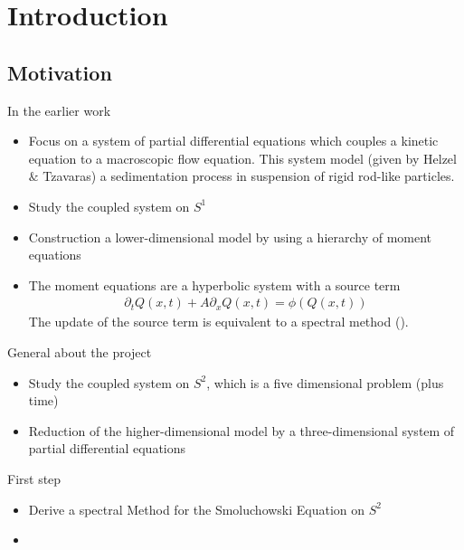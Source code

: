 \section{Introduction}
\subsection{Motivation}
\begin{frame}
	\scriptsize
	\begin{block}{In the earlier work}
		\begin{itemize}
			\item <1-> Focus on a system of partial differential equations which couples a kinetic equation to a macroscopic flow equation. This system model (given by Helzel $\&$ Tzavaras) a sedimentation process in suspension of rigid rod-like particles.
			\item <2-> Study the coupled system on $S^1$
			\item <3-> Construction a lower-dimensional model by using a hierarchy of moment equations
			\item <4-> The moment equations are a hyperbolic system with a source term
			\begin{align*}
				\partial_t Q(x,t) + A\partial_x Q(x,t) = \phi(Q(x,t))
		    \end{align*}
			The update of the source term is equivalent to a spectral method (\cite{doi:10.1137/21M1464592}).
		\end{itemize}
	\end{block}
	\begin{block}{General about the project}
		\begin{itemize}
			\item <5->  Study the coupled system on $S^2$, which is a five dimensional problem (plus time)
			\item <6-> Reduction of the higher-dimensional model by a three-dimensional system of partial differential equations
		\end{itemize}
	\end{block}
	\begin{block}{First step}
		\begin{itemize}
			\item <7-> Derive a spectral Method for the Smoluchowski Equation on $S^2$
			\item <8-> 
		\end{itemize}
	\end{block}
\end{frame}






